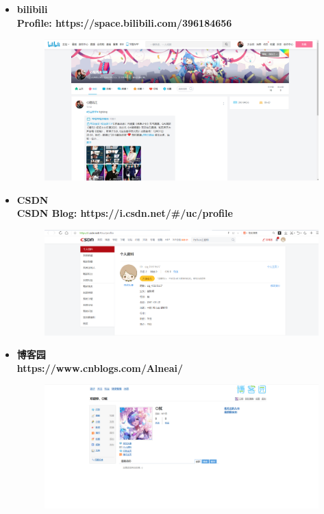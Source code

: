 \documentclass{article}
\begin{document}
\begin{itemize}
{\begin{figure}[h]
            \label{fig:1.4}
        \end{figure}
    }
    \item {
        \bf{bilibili}\\
        Profile: https://space.bilibili.com/396184656\\
        \begin{figure}[h]
            \centering
            \includegraphics[scale=0.2]{1.5}
            \label{fig:1.5}
        \end{figure} 
    }
\newpage
    \item {
        \bf{CSDN}\\
        CSDN Blog: https://i.csdn.net/\#/uc/profile\\
        \begin{figure}[h]
            \centering
            \includegraphics[scale=0.2]{1.6}
            \label{fig:1.6}
        \end{figure}
    }
    \item {
        \bf{博客园}\\
        https://www.cnblogs.com/Alneai/\\
        \begin{figure}[h]
            \centering
            \includegraphics[scale=0.2]{1.7.1}

\end{figure}}
\end{itemize}
\end{document}
